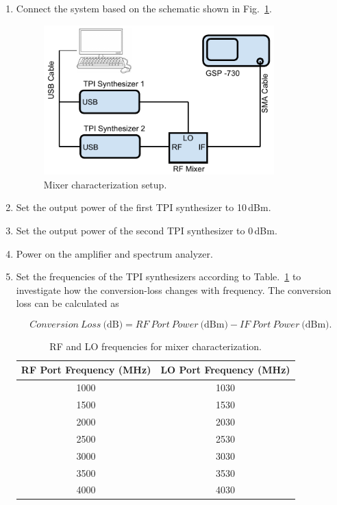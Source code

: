 \documentclass[letterpaper, 11pt]{article}
\begin{document}
\begin{enumerate}
	\item Connect the system based on the schematic shown in Fig.~\ref{fig:setup-mixer}.
	
		\begin{figure}[ht]
			\centering	
			\includegraphics[width=3.5in]{setup-mixer}
			\caption{Mixer characterization setup.}
			\label{fig:setup-mixer}
		\end{figure}
	
	\item Set the output power of the first TPI synthesizer to 10\,dBm. 
	
	\item Set the output power of the second TPI synthesizer to 0\,dBm. 
	
	\item Power on the amplifier and spectrum analyzer. 
	
	\item Set the frequencies of the TPI synthesizers according to Table.~\ref{tab:freq} to investigate how the conversion-loss changes with frequency. The conversion loss can be calculated as 
	
	\[
		Conversion~Loss~\text{(dB)} = RF~Port~Power~\text{(dBm)} - IF~Port~Power~\text{(dBm)}.	
	\]
	
	\begin{table}[h]
		\centering
		\caption{RF and LO frequencies for mixer characterization.}
		\renewcommand{\arraystretch}{1.2}
		\begin{tabular}{|c|c|}
			\hline  RF Port Frequency (MHz) & LO Port Frequency (MHz)  \\ 
			\hline
			\hline  1000 & 1030  \\ 
			\hline  1500 & 1530 \\ 
			\hline  2000 & 2030 \\ 
			\hline  2500 & 2530 \\ 
			\hline  3000 & 3030 \\ 
			\hline  3500 & 3530  \\ 
			\hline  4000 & 4030 \\ 
			\hline 
		\end{tabular} 
		\label{tab:freq}
	\end{table}
	
\end{enumerate}
\end{document}
